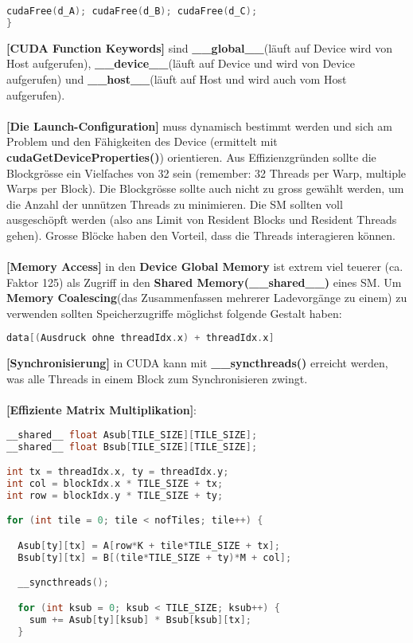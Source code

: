 \documentclass[8pt]{extarticle}
\let\oldtextbf\textbf
\renewcommand{\textbf}{\tiny\oldtextbf}
\begin{document}
\begin{multicols*}{5}
\begin{lstlisting}[language=c]
  cudaFree(d_A); cudaFree(d_B); cudaFree(d_C);
}
\end{lstlisting}
\textbf{[CUDA Function Keywords]} sind \textbf{\_\_global\_\_}(läuft auf Device wird von Host aufgerufen), \textbf{\_\_device\_\_}(läuft auf Device und wird von Device aufgerufen) und \textbf{\_\_host\_\_}(läuft auf Host und wird auch vom Host aufgerufen).\\\\
\textbf{[Die Launch-Configuration]} muss dynamisch bestimmt werden und sich am Problem und den Fähigkeiten des Device (ermittelt mit \textbf{cudaGetDeviceProperties()}) orientieren. Aus Effizienzgründen sollte die Blockgrösse ein Vielfaches von 32 sein (remember: 32 Threads per Warp, multiple Warps per Block). Die Blockgrösse sollte auch nicht zu gross gewählt werden, um die Anzahl der unnützen Threads zu minimieren. Die SM sollten voll ausgeschöpft werden (also ans Limit von Resident Blocks und Resident Threads gehen). Grosse Blöcke haben den Vorteil, dass die Threads interagieren können.\\\\
\textbf{[Memory Access]} in den \textbf{Device Global Memory} ist extrem viel teuerer (ca. Faktor 125) als Zugriff in den \textbf{Shared Memory(\_\_shared\_\_)} eines SM. Um \textbf{Memory Coalescing}(das Zusammenfassen mehrerer Ladevorgänge zu einem) zu verwenden sollten Speicherzugriffe möglichst folgende Gestalt haben:
\begin{lstlisting}[language=c]
data[(Ausdruck ohne threadIdx.x) + threadIdx.x]
\end{lstlisting}
\textbf{[Synchronisierung]} in CUDA kann mit \textbf{\_\_syncthreads()} erreicht werden, was alle Threads in einem Block zum Synchronisieren zwingt.\\\\
\textbf{[Effiziente Matrix Multiplikation]}:
\begin{lstlisting}[language=c]
__shared__ float Asub[TILE_SIZE][TILE_SIZE];
__shared__ float Bsub[TILE_SIZE][TILE_SIZE];

int tx = threadIdx.x, ty = threadIdx.y;
int col = blockIdx.x * TILE_SIZE + tx;
int row = blockIdx.y * TILE_SIZE + ty;

for (int tile = 0; tile < nofTiles; tile++) {

  Asub[ty][tx] = A[row*K + tile*TILE_SIZE + tx];
  Bsub[ty][tx] = B[(tile*TILE_SIZE + ty)*M + col];

  __syncthreads();

  for (int ksub = 0; ksub < TILE_SIZE; ksub++) {
    sum += Asub[ty][ksub] * Bsub[ksub][tx];
  }


\end{lstlisting}
\end{multicols*}
\end{document}
